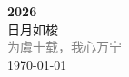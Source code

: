 \vspace*{\fill}
\begin{center}
    \textcolor{brown!50}{\Huge\textbf{2026}} \\[1em]
    \textcolor{brown!60!white}{\Large 日月如梭} \\[2em]
    \textcolor{gray}{\large 为虞十载，我心万宁} \\[1em]
    \today
\end{center}
\vspace*{\fill}
\clearpage


\clearpage

\clearpage

\clearpage

\clearpage


